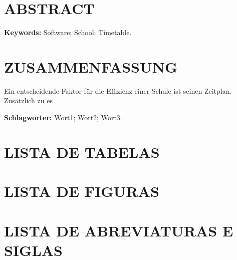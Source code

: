 \documentclass[12pt,a4paper]{article}
\begin{document}
	\thispagestyle{empty}
	\section*{ABSTRACT}


	\begingroup
		\setlength{\parindent}{0mm}
		\textbf{Keywords:} Software; School; Timetable.
	\endgroup

	\newpage


	\thispagestyle{empty}
	\section*{ZUSAMMENFASSUNG}

	Ein entscheidende Faktor für die Effizienz einer Schule ist seinen Zeitplan. Zusätzlich zu es

	\lipsum[1]


	\begingroup
		\setlength{\parindent}{0mm}
		\textbf{Schlagworter:} Wort1; Wort2; Wort3.
	\endgroup

	\newpage

	\thispagestyle{empty}
	\section*{LISTA DE TABELAS}

	\listoftables

	\newpage

	\thispagestyle{empty}
	\section*{LISTA DE FIGURAS}

	\listoffigures

	\newpage


	\thispagestyle{empty}
	\section*{LISTA DE ABREVIATURAS E SIGLAS}
\end{document}

